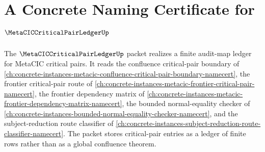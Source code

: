 \chapter{A Concrete Naming Certificate for $\MetaCICCriticalPairLedgerUp$}
\label{ch:concrete-instances-metacic-critical-pair-ledger-namecert}

The $\MetaCICCriticalPairLedgerUp$ packet realizes a finite audit-map ledger for MetaCIC critical pairs. It reads the confluence critical-pair boundary of \autoref{ch:concrete-instances-metacic-confluence-critical-pair-boundary-namecert}, the frontier critical-pair route of \autoref{ch:concrete-instances-metacic-frontier-critical-pair-namecert}, the frontier dependency matrix of \autoref{ch:concrete-instances-metacic-frontier-dependency-matrix-namecert}, the bounded normal-equality checker of \autoref{ch:concrete-instances-bounded-normal-equality-checker-namecert}, and the subject-reduction route classifier of \autoref{ch:concrete-instances-subject-reduction-route-classifier-namecert}. The packet stores critical-pair entries as a ledger of finite rows rather than as a global confluence theorem.



